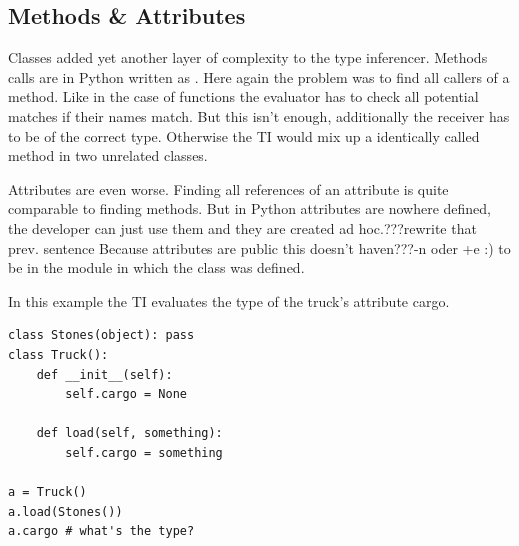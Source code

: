 \documentclass[12pt,halfparskip,DIV11,BCOR10mm]{scrreprt}
\begin{document}
\subsection{Methods \& Attributes}

Classes added yet another layer of complexity to the type inferencer. Methods calls are in Python written as . Here again the problem was to find all callers of a method. Like in the case of functions the evaluator has to check all potential matches if their names match. But this isn't enough,  additionally the receiver has to be of the correct type. Otherwise the TI would mix up a identically called method in two unrelated classes. 

Attributes are even worse. Finding all references of an attribute is quite comparable to finding methods. But in Python attributes are nowhere defined, the developer can just use them and they are created ad hoc.???rewrite that prev. sentence Because attributes are public this doesn't haven???-n oder +e :) to be in the module in which the class was defined.

In this example the TI evaluates the type of the truck's attribute cargo.

\begin{lstlisting}
class Stones(object): pass
class Truck():
    def __init__(self):
        self.cargo = None
    
    def load(self, something):
        self.cargo = something

a = Truck()
a.load(Stones())
a.cargo # what's the type?
\end{lstlisting}
\end{document}
